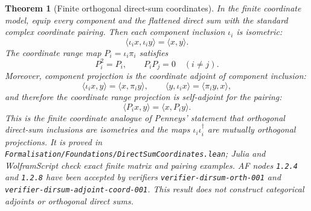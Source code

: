 \documentclass[11pt]{article}
\newtheorem{theorem}[definition]{Theorem}
\begin{document}
\begin{theorem}[Finite orthogonal direct-sum coordinates]
In the finite coordinate model, equip every component and the flattened direct
sum with the standard complex coordinate pairing. Then each component
inclusion \(\iota_i\) is isometric:
\[
\langle \iota_i x,\iota_i y\rangle
=
\langle x,y\rangle .
\]
The coordinate range map \(P_i=\iota_i\pi_i\) satisfies
\[
P_i^2=P_i,
\qquad
P_iP_j=0\quad(i\ne j).
\]
Moreover, component projection is the coordinate adjoint of component
inclusion:
\[
\langle \iota_i x,y\rangle
=
\langle x,\pi_i y\rangle,
\qquad
\langle y,\iota_i x\rangle
=
\langle \pi_i y,x\rangle,
\]
and therefore the coordinate range projection is self-adjoint for the
pairing:
\[
\langle P_i x,y\rangle=\langle x,P_i y\rangle .
\]
This is the finite coordinate analogue of Penneys' statement that orthogonal
direct-sum inclusions are isometries and the maps
\(\iota_i\iota_i^\dagger\) are mutually orthogonal projections. It is proved
in \texttt{Formalisation/Foundations/DirectSumCoordinates.lean}; Julia and
WolframScript check exact finite matrix and pairing examples. AF nodes
\texttt{1.2.4} and \texttt{1.2.8} have been accepted by verifiers
\texttt{verifier-dirsum-orth-001} and
\texttt{verifier-dirsum-adjoint-coord-001}. This result does not construct
categorical adjoints or orthogonal direct sums.
\end{theorem}
\end{document}
